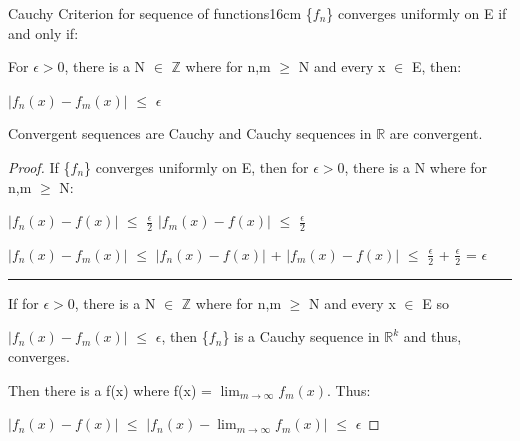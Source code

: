     \vspace{0.5cm}



    \begin{wtheorem}{Cauchy Criterion for sequence of functions}{16cm}
        \{$f_n$\} converges uniformly on E if and only if:
        
        \hspace{0.5cm}
        For $\epsilon > 0$, there is a N $\in$ $\mathbb{Z}$ where for n,m $\geq$ N
        and every x $\in$ E, then:
        
        \hspace{1cm}
        $|f_n(x) - f_m(x)|$ $\leq$ $\epsilon$        
    \end{wtheorem}


    \begin{intuition}
        Convergent sequences are Cauchy
        and Cauchy sequences in $\mathbb{R}$ are convergent.
    \end{intuition}

    \vspace{0.1cm}

    \begin{proof}
        If \{$f_n$\} converges uniformly on E, then for $\epsilon > 0$, there is a N
        where for n,m $\geq$ N:

        \hspace{0.5cm}
        $|f_n(x) - f(x)|$ $\leq$ $\frac{\epsilon}{2}$
        \hspace{1cm}
        $|f_m(x) - f(x)|$ $\leq$ $\frac{\epsilon}{2}$

        \hspace{0.5cm}
        $|f_n(x) - f_m(x)|$
        $\leq$ $|f_n(x) - f(x)|$ + $|f_m(x) - f(x)|$
        $\leq$ $\frac{\epsilon}{2}$ + $\frac{\epsilon}{2}$
        = $\epsilon$

        \rule[0.1cm]{15cm}{0.01cm}

        If for $\epsilon > 0$, there is a N $\in$ $\mathbb{Z}$ where for n,m $\geq$ N
        and every x $\in$ E so

        $|f_n(x) - f_m(x)|$ $\leq$ $\epsilon$, then \{$f_n$\} is a Cauchy sequence
        in $\mathbb{R}^k$ and thus, converges.

        Then there is a f(x) where f(x) = $\lim_{m \rightarrow \infty} f_m(x)$. Thus:

        \hspace{0.5cm}
        $|f_n(x) - f(x)|$
        $\leq$ $|f_n(x) - \lim_{m \rightarrow \infty} f_m(x)|$
        $\leq$ $\epsilon$
    \end{proof}

